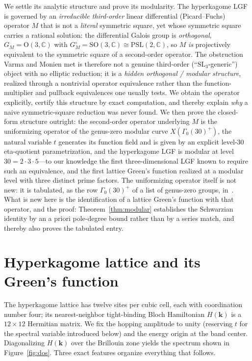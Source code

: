 \documentclass[11pt]{article}
\theoremstyle{plain}
\theoremstyle{remark}
\begin{document}
We settle its analytic structure and prove its modularity. The hyperkagome LGF is governed by an \emph{irreducible third-order}
linear differential (Picard--Fuchs) operator $M$ that is not a \emph{literal} symmetric square, yet whose symmetric square carries a
rational solution: the differential Galois group is \emph{orthogonal}, $G_M=\mathrm{O}(3,\mathbb{C})$ with
$G_M^\circ=\mathrm{SO}(3,\mathbb{C})\cong\mathrm{PSL}(2,\mathbb{C})$, so $M$ \emph{is} projectively equivalent to the
symmetric square of a second-order operator. The obstruction Varma and Monien met is therefore not a genuine
third-order (``$\mathrm{SL}_3$-generic'') object with no elliptic reduction; it is a \emph{hidden orthogonal /
modular structure}, realized through a nontrivial operator equivalence rather than the function-multiplier and
pullback equivalences one usually tests. We obtain the operator explicitly, certify this structure by exact
computation, and thereby explain \emph{why} a naive symmetric-square reduction was never found. We then prove the
closed-form structure outright: the second-order operator underlying $M$ is the uniformizing operator of the
genus-zero modular curve $X(\Gamma_0(30)^+)$, the natural variable $t$ generates its function field and is given
by an explicit level-30 eta-quotient parametrization, and the hyperkagome LGF is modular at level
$30=2\cdot3\cdot5$---to our knowledge the first
three-dimensional LGF known to require such an equivalence, and the first lattice Green's function realized at a
modular level with three distinct prime factors. The uniformizing operator itself is not new: it is tabulated,
as the row $\Gamma_0(30)^+$ of a list of genus-zero groups, in~\cite{LianYau1995}. What is new here is the
identification of a lattice Green's function with that operator, and the proof: Theorem~\ref{thm:modular}
establishes the Schwarzian identity by an a priori pole-degree bound rather than by a series match, and thereby
also proves the tabulated entry.

\section{Hyperkagome lattice and its Green's function}
\label{sec:lattice}
The hyperkagome lattice has twelve sites per cubic cell, each with coordination number four; its nearest-neighbor
tight-binding Bloch Hamiltonian $H(\bm k)$ is a $12\times12$ Hermitian matrix. We fix the hopping amplitude to
unity (reserving $t$ for the spectral variable introduced below) and the energy origin at the band center.
Diagonalizing $H(\bm k)$ over the Brillouin zone yields the spectrum shown in
Figure~\ref{fig:dos}. Three exact features organize everything that follows.
\end{document}
